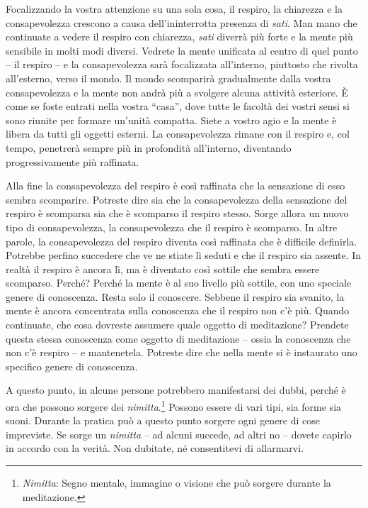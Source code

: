 Focalizzando la vostra attenzione su una sola cosa, il respiro, la
chiarezza e la consapevolezza crescono a causa dell'ininterrotta
presenza di \emph{sati}. Man mano che continuate a vedere il respiro con
chiarezza, \emph{sati} diverrà più forte e la mente più sensibile in
molti modi diversi. Vedrete la mente unificata al centro di quel punto
-- il respiro -- e la consapevolezza sarà focalizzata all'interno,
piuttosto che rivolta all'esterno, verso il mondo. Il mondo scomparirà
gradualmente dalla vostra consapevolezza e la mente non andrà più a
svolgere alcuna attività esteriore. È come se foste entrati nella vostra
``casa'', dove tutte le facoltà dei vostri sensi si sono riunite per
formare un'unità compatta. Siete a vostro agio e la mente è libera da
tutti gli oggetti esterni. La consapevolezza rimane con il respiro e,
col tempo, penetrerà sempre più in profondità all'interno, diventando
progressivamente più raffinata.

Alla fine la consapevolezza del respiro è così raffinata che la
sensazione di esso sembra scomparire. Potreste dire sia che la
consapevolezza della sensazione del respiro è scomparsa sia che è
scomparso il respiro stesso. Sorge allora un nuovo tipo di
consapevolezza, la consapevolezza che il respiro è scomparso. In altre
parole, la consapevolezza del respiro diventa così raffinata che è
difficile definirla. Potrebbe perfino succedere che ve ne stiate lì
seduti e che il respiro sia assente. In realtà il respiro è ancora lì,
ma è diventato così sottile che sembra essere scomparso. Perché? Perché
la mente è al suo livello più sottile, con uno speciale genere di
conoscenza. Resta solo il conoscere. Sebbene il respiro sia svanito, la
mente è ancora concentrata sulla conoscenza che il respiro non c'è più.
Quando continuate, che cosa dovreste assumere quale oggetto di
meditazione? Prendete questa stessa conoscenza come oggetto di
meditazione -- ossia la conoscenza che non c'è respiro -- e mantenetela.
Potreste dire che nella mente si è instaurato uno specifico genere di
conoscenza.

A questo punto, in alcune persone potrebbero manifestarsi dei dubbi,
perché è ora che possono sorgere dei \emph{nimitta}.\footnote{%
  \emph{Nimitta}:
  Segno mentale, immagine o visione che può sorgere durante la
  meditazione.} Possono essere di vari tipi, sia forme sia suoni.
Durante la pratica può a questo punto sorgere ogni genere di cose
impreviste. Se sorge un \emph{nimitta} -- ad alcuni succede, ad altri no
-- dovete capirlo in accordo con la verità. Non dubitate, né
consentitevi di allarmarvi.

